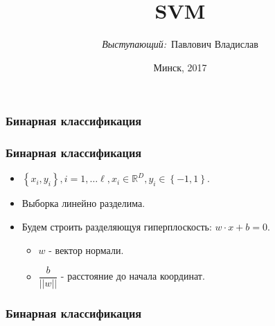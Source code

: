 \documentclass[14pt]{beamer}
\title{SVM}
\author{\small{%
\emph{Выступающий:}~Павлович Владислав}
\vspace{20pt}%
}
\date{\small{Минск, 2017}}
\begin{document}
\maketitle

\begin{frame}
\frametitle{Бинарная классификация}
\end{frame}

\begin{frame}
\frametitle{Бинарная классификация}
\begin{itemize}
\item<1-> $\left\{x_i, y_i\right\}, i = 1, \ldots \ell,
    x_i \in \mathbb{R}^D, y_i \in \left\{-1, 1\right\}$.
\item<2-> Выборка линейно разделима.
\item<3-> Будем строить разделяющуя гиперплоскость: $w \cdot x + b = 0$.
  \begin{itemize}
    \item $w$ - вектор нормали.
    \item $\dfrac{b}{||w||}$ - расстояние до начала координат.
  \end{itemize}
\end{itemize}
\end{frame}

\begin{frame}
\frametitle{Бинарная классификация}
\end{frame}
\end{document}
